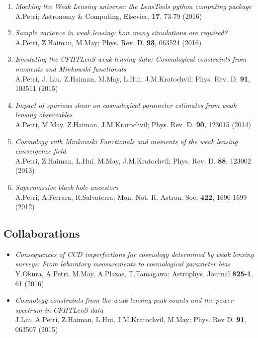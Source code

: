 \documentclass[margin]{res} %
\begin{document}
\begin{resume}
\begin{enumerate}
\item {\sl Mocking the Weak Lensing universe: the LensTools python computing package} \\
A.Petri; Astronomy \& Computing, Elsevier, \textbf{17}, 73-79 (2016)
\item {\sl Sample variance in weak lensing: how many simulations are required?} \\
A.Petri, Z.Haiman, M.May; Phys. Rev. D. \textbf{93}, 063524 (2016)
\item {\sl Emulating the CFHTLenS weak lensing data: Cosmological constraints from moments and Minkowski functionals} \\
A.Petri, J. Liu, Z.Haiman, M.May, L.Hui, J.M.Kratochvil; Phys. Rev. D. \textbf{91}, 103511 (2015)
\item {\sl Impact of spurious shear on cosmological parameter estimates from weak lensing observables} \\
A.Petri, M.May, Z.Haiman, J.M.Kratochvil; Phys. Rev. D. \textbf{90}, 123015 (2014)
\item {\sl Cosmology with Minkowski Functionals and moments of the weak lensing convergence field} \\
A.Petri, Z.Haiman, L.Hui, M.May, J.M.Kratochvil; Phys. Rev. D. \textbf{88}, 123002 (2013)
\item {\sl Supermassive black hole ancestors} \\
A.Petri, A.Ferrara, R.Salvaterra; Mon. Not. R. Astron. Soc. \textbf{422}, 1690-1699 (2012)

\end{enumerate}

\subsection{Collaborations}

\begin{itemize}
\item {\sl Consequences of CCD imperfections for cosmology determined by weak lensing surveys: From laboratory measurements to cosmological parameter bias} \\ 
Y.Okura, A.Petri, M.May, A.Plazas, T.Tamagawa; Astrophys. Journal \textbf{825-1}, 61 (2016) 
\item {\sl Cosmology constraints from the weak lensing peak counts and the power spectrum in CFHTLenS data} \\ 
J.Liu, A.Petri, Z.Haiman, L.Hui, J.M.Kratochvil, M.May; Phys. Rev D. \textbf{91}, 063507 (2015)
\end{itemize}


\end{resume}
\end{document}
